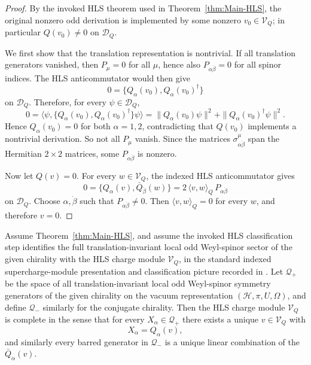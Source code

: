 \begin{proof}
By the invoked HLS theorem used in Theorem~\ref{thm:Main-HLS}, the original
nonzero odd derivation is implemented by some nonzero \(v_0\in\mathcal V_Q\); in
particular \(Q(v_0)\neq 0\) on \(\mathcal D_Q\).

We first show that the translation representation is nontrivial. If all
translation generators vanished, then \(P_\mu=0\) for all \(\mu\), hence also
\(P_{\alpha\dot\beta}=0\) for all spinor indices. The HLS anticommutator would
then give
\[
0
=
\{Q_\alpha(v_0),Q_\alpha(v_0)^\dagger\}
\]
on \(\mathcal D_Q\). Therefore, for every \(\psi\in\mathcal D_Q\),
\[
0
=
\langle\psi,\{Q_\alpha(v_0),Q_\alpha(v_0)^\dagger\}\psi\rangle
=
\|Q_\alpha(v_0)\psi\|^2+\|Q_\alpha(v_0)^\dagger\psi\|^2.
\]
Hence \(Q_\alpha(v_0)=0\) for both \(\alpha=1,2\), contradicting that \(Q(v_0)\)
implements a nontrivial derivation. So not all \(P_\mu\) vanish. Since the
matrices \(\sigma^\mu_{\alpha\dot\beta}\) span the Hermitian \(2\times2\)
matrices, some \(P_{\alpha\dot\beta}\) is nonzero.

Now let \(Q(v)=0\). For every \(w\in\mathcal V_Q\), the indexed HLS
anticommutator gives
\[
0
=
\{Q_\alpha(v),\bar Q_{\dot\beta}(w)\}
=
2\,\langle v,w\rangle_Q\,P_{\alpha\dot\beta}
\]
on \(\mathcal D_Q\). Choose \(\alpha,\dot\beta\) such that
\(P_{\alpha\dot\beta}\neq 0\). Then \(\langle v,w\rangle_Q=0\) for every \(w\),
and therefore \(v=0\).
\end{proof}

\begin{theorem}
\label{thm:HLS-spinor-completeness}
Assume Theorem~\ref{thm:Main-HLS}, and assume the invoked HLS classification step
identifies the full translation-invariant local odd Weyl-spinor sector of the
given chirality with the HLS charge module \(\mathcal V_Q\), in the standard
indexed supercharge-module presentation and classification picture recorded in
\cite{Sohnius:1985qm,Nahm1978}. Let
\(\mathscr Q_+\) be the space of all translation-invariant local odd Weyl-spinor
symmetry generators of the given chirality on the vacuum representation
\((\mathcal H,\pi,U,\Omega)\), and define \(\mathscr Q_-\) similarly for the
conjugate chirality. Then the HLS charge module \(\mathcal V_Q\) is complete in the
sense that for every \(X_\alpha\in\mathscr Q_+\) there exists a unique
\(v\in\mathcal V_Q\) with
\[
X_\alpha = Q_\alpha(v),
\]
and similarly every barred generator in \(\mathscr Q_-\) is a unique linear
combination of the \(\bar Q_{\dot\alpha}(v)\).
\end{theorem}

